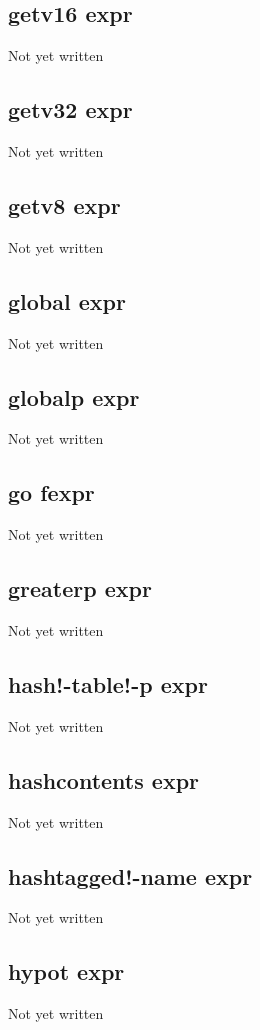 \documentclass[a4paper,11pt]{article}
\begin{document}
{\subsection{\ttfamily getv16 expr}
   Not yet written

\subsection{\ttfamily getv32 expr}
   Not yet written

\subsection{\ttfamily getv8 expr}
   Not yet written

\subsection{\ttfamily global expr}
   Not yet written

\subsection{\ttfamily globalp expr}
   Not yet written

\subsection{\ttfamily go fexpr}
   Not yet written

\subsection{\ttfamily greaterp expr}
   Not yet written

\subsection{\ttfamily hash!-table!-p expr}
   Not yet written

\subsection{\ttfamily hashcontents expr}
   Not yet written

\subsection{\ttfamily hashtagged!-name expr}
   Not yet written

\subsection{\ttfamily hypot expr}
   Not yet written

}
\end{document}
